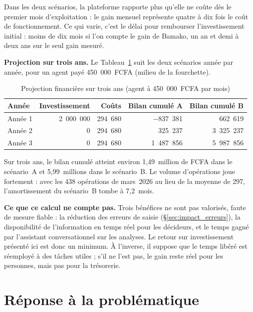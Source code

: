 Dans les deux scénarios, la plateforme rapporte plus qu'elle ne coûte dès le premier mois d'exploitation : le gain mensuel représente quatre à dix fois le coût de fonctionnement. Ce qui varie, c'est le délai pour rembourser l'investissement initial : moins de dix mois si l'on compte le gain de Bamako, un an et demi à deux ans sur le seul gain mesuré.

\textbf{Projection sur trois ans.} Le Tableau~\ref{tab:roi_projection} suit les deux scénarios année par année, pour un agent payé 450~000~FCFA (milieu de la fourchette).

\begin{table}[H]
\centering
\footnotesize
\caption{Projection financière sur trois ans (agent à 450~000~FCFA par mois)}
\label{tab:roi_projection}
\begin{tabular}{|l|r|r|r|r|}
\hline
\rowcolor[HTML]{EFEFEF}
\textbf{Année} & \textbf{Investissement} & \textbf{Coûts} & \textbf{Bilan cumulé A} & \textbf{Bilan cumulé B} \\ \hline
Année 1 & 2~000~000 & 294~680 & $-$837~381 & 662~619 \\ \hline
Année 2 & 0 & 294~680 & 325~237 & 3~325~237 \\ \hline
Année 3 & 0 & 294~680 & 1~487~856 & 5~987~856 \\ \hline
\end{tabular}
\end{table}

Sur trois ans, le bilan cumulé atteint environ 1,49~million de FCFA dans le scénario~A et 5,99~millions dans le scénario~B. Le volume d'opérations joue fortement : avec les 438 opérations de mars~2026 au lieu de la moyenne de 297, l'amortissement du scénario~B tombe à 7,2~mois.

\textbf{Ce que ce calcul ne compte pas.} Trois bénéfices ne sont pas valorisés, faute de mesure fiable : la réduction des erreurs de saisie (§\ref{sec:impact_erreurs}), la disponibilité de l'information en temps réel pour les décideurs, et le temps gagné par l'assistant conversationnel sur les analyses. Le retour sur investissement présenté ici est donc un minimum. À l'inverse, il suppose que le temps libéré est réemployé à des tâches utiles ; s'il ne l'est pas, le gain reste réel pour les personnes, mais pas pour la trésorerie.

\section{Réponse à la problématique}
\label{sec:reponse_problematique}

